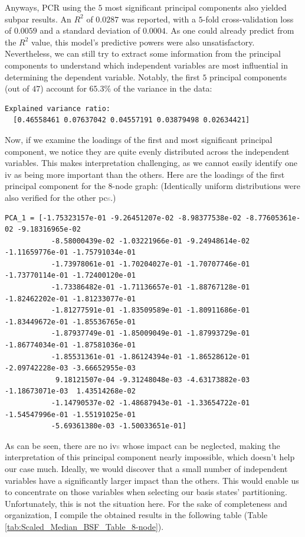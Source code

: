 Anyways, PCR using the $5$ most significant principal components also yielded subpar results. An $R^2$ of $0.0287$ was reported, with a $5$-fold cross-validation loss of $0.0059$ and a standard deviation of $0.0004$. As one could already predict from the $R^2$ value, this model's predictive powers were also unsatisfactory. Nevertheless, we can still try to extract some information from the principal components to understand which independent variables are most influential in determining the dependent variable. Notably, the first $5$ principal components (out of $47$) account for $65.3\%$ of the variance in the data:
\begin{lstlisting}[caption={Explained variance ratio for the first $5$ \acrshort{pc}\textcolor{gray}{s} ($8$-node graph).}, captionpos=b, style=DOS]
  Explained variance ratio:
  [0.46558461 0.07637042 0.04557191 0.03879498 0.02634421]
\end{lstlisting}
Now, if we examine the loadings of the first and most significant principal component, we notice they are quite evenly distributed across the independent variables. This makes interpretation challenging, as we cannot easily identify one \acrshort{iv} as being more important than the others. Here are the loadings of the first principal component for the $8$-node graph: (Identically uniform distributions were also verified for the other \acrshort{pc}\textcolor{gray}{s}.)
\begin{lstlisting}[caption={Loadings of the first \acrshort{pc}, for the $8$-node graph.}, captionpos=b, style=DOS]
  PCA_1 = [-1.75323157e-01 -9.26451207e-02 -8.98377538e-02 -8.77605361e-02 -9.18316965e-02
           -8.58000439e-02 -1.03221966e-01 -9.24948614e-02 -1.11659776e-01 -1.75791034e-01
           -1.73978061e-01 -1.70204027e-01 -1.70707746e-01 -1.73770114e-01 -1.72400120e-01
           -1.73386482e-01 -1.71136657e-01 -1.88767128e-01 -1.82462202e-01 -1.81233077e-01
           -1.81277591e-01 -1.83509589e-01 -1.80911686e-01 -1.83449672e-01 -1.85536765e-01
           -1.87937749e-01 -1.85009049e-01 -1.87993729e-01 -1.86774034e-01 -1.87581036e-01
           -1.85531361e-01 -1.86124394e-01 -1.86528612e-01 -2.09742228e-03 -3.66652955e-03
            9.18121507e-04 -9.31248048e-03 -4.63173882e-03 -1.18673071e-03  1.43514268e-02
           -1.14790537e-02 -1.48687943e-01 -1.33654722e-01 -1.54547996e-01 -1.55191025e-01
           -5.69361380e-03 -1.50033651e-01]
  \end{lstlisting}
As can be seen, there are no \acrshort{iv}\textcolor{gray}{s} whose impact can be neglected, making the interpretation of this principal component nearly impossible, which doesn't help our case much. Ideally, we would discover that a small number of independent variables have a significantly larger impact than the others. This would enable us to concentrate on those variables when selecting our basis states' partitioning. Unfortunately, this is not the situation here. For the sake of completeness and organization, I compile the obtained results in the following table (Table \ref{tab:Scaled_Median_BSF_Table_8-node}).
